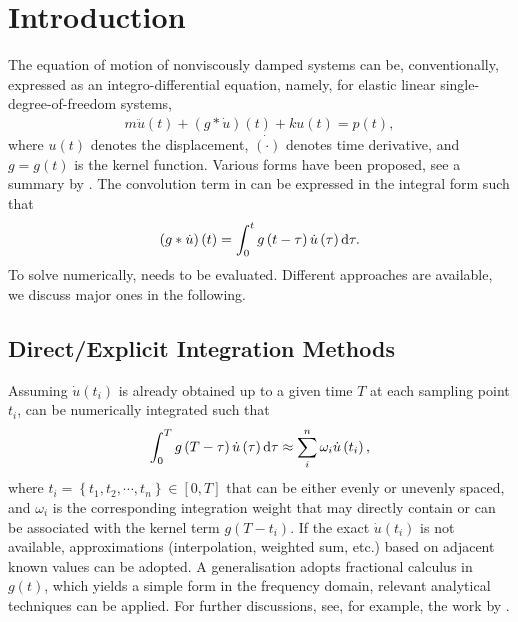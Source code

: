 \section{Introduction}
The equation of motion of nonviscously damped systems can be, conventionally, expressed as an integro-differential equation, namely, for elastic linear single-degree-of-freedom systems,
\begin{gather}\label{eq:single_eom}
m\ddot{u}\left(t\right)+\left(g*\dot{u}\right)\left(t\right)+ku\left(t\right)=p\left(t\right),
\end{gather}
where $u(t)$ denotes the displacement, $\dot{(\cdot)}$ denotes time derivative, and $g=g(t)$ is the kernel function. Various forms have been proposed, see a summary by \citet[][Table 1]{Adhikari2003}.
The convolution term in  can be expressed in the integral form such that
\begin{gather}\label{eq:conv}
\left(g*\dot{u}\right)\left(t\right)=\int_0^tg\left(t-\tau\right)\dot{u}\left(\tau\right)\mathrm{d}\tau.
\end{gather}
To solve  numerically,  needs to be evaluated. Different approaches are available, we discuss major ones in the following.
\subsection{Direct/Explicit Integration Methods}
Assuming $\dot{u}(t_i)$ is already obtained up to a given time $T$ at each sampling point $t_i$,  can be numerically integrated such that
\begin{gather}
\int_0^Tg\left(T-\tau\right)\dot{u}\left(\tau\right)\mathrm{d}\tau\approx\sum_i^n\omega_i\dot{u}\left(t_i\right),
\end{gather}
where $t_i=\left\{t_1,t_2,\cdots,t_n\right\}\in[0,T]$ that can be either evenly or unevenly spaced, and $\omega_i$ is the corresponding integration weight that may directly contain or can be associated \citep{Schaedle2006} with the kernel term $g\left(T-t_i\right)$. If the exact $\dot{u}(t_i)$ is not available, approximations (interpolation, weighted sum, etc.) based on adjacent known values can be adopted. A generalisation adopts fractional calculus \citep[e.g.,][]{Bagley1983,Gaul1999} in $g(t)$, which yields a simple form in the frequency domain, relevant analytical techniques can be applied. For further discussions, see, for example, the work by \citet{Fernandez2019}.

